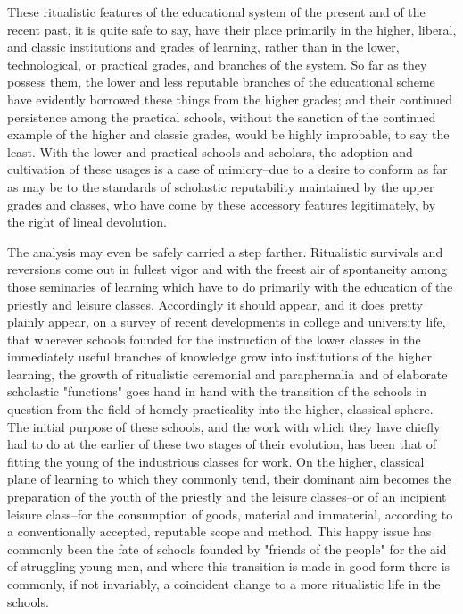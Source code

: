 \documentclass[12pt]{report}
\begin{document}
These ritualistic features of the educational system of the present and
of the recent past, it is quite safe to say, have their place primarily
in the higher, liberal, and classic institutions and grades of learning,
rather than in the lower, technological, or practical grades, and
branches of the system. So far as they possess them, the lower and less
reputable branches of the educational scheme have evidently borrowed
these things from the higher grades; and their continued persistence
among the practical schools, without the sanction of the continued
example of the higher and classic grades, would be highly improbable,
to say the least. With the lower and practical schools and scholars, the
adoption and cultivation of these usages is a case of mimicry--due to
a desire to conform as far as may be to the standards of scholastic
reputability maintained by the upper grades and classes, who have
come by these accessory features legitimately, by the right of lineal
devolution.

The analysis may even be safely carried a step farther. Ritualistic
survivals and reversions come out in fullest vigor and with the freest
air of spontaneity among those seminaries of learning which have to
do primarily with the education of the priestly and leisure classes.
Accordingly it should appear, and it does pretty plainly appear, on
a survey of recent developments in college and university life, that
wherever schools founded for the instruction of the lower classes in the
immediately useful branches of knowledge grow into institutions of the
higher learning, the growth of ritualistic ceremonial and paraphernalia
and of elaborate scholastic "functions" goes hand in hand with
the transition of the schools in question from the field of homely
practicality into the higher, classical sphere. The initial purpose of
these schools, and the work with which they have chiefly had to do at
the earlier of these two stages of their evolution, has been that of
fitting the young of the industrious classes for work. On the higher,
classical plane of learning to which they commonly tend, their dominant
aim becomes the preparation of the youth of the priestly and the leisure
classes--or of an incipient leisure class--for the consumption of
goods, material and immaterial, according to a conventionally accepted,
reputable scope and method. This happy issue has commonly been the fate
of schools founded by "friends of the people" for the aid of struggling
young men, and where this transition is made in good form there is
commonly, if not invariably, a coincident change to a more ritualistic
life in the schools.
\end{document}
